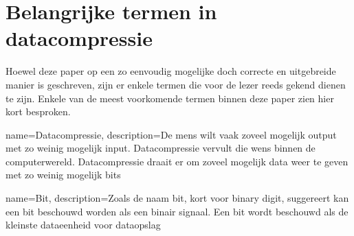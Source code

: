 \chapter{Belangrijke termen in datacompressie}
\label{ch:termen}

Hoewel deze paper op een zo eenvoudig mogelijke doch correcte en uitgebreide manier is geschreven, zijn er enkele termen die voor de lezer reeds gekend dienen te zijn. Enkele van de meest voorkomende termen binnen deze paper zien hier kort besproken.




{
	name={Datacompressie},
	description={De mens wilt vaak zoveel mogelijk output met zo weinig mogelijk input. Datacompressie vervult die wens binnen de computerwereld. Datacompressie draait er om zoveel mogelijk data weer te geven met zo weinig mogelijk bits}
}

{
	name={Bit},
	description={Zoals de naam bit, kort voor binary digit, suggereert kan een bit beschouwd worden als een binair signaal. Een bit wordt beschouwd als de kleinste dataeenheid voor dataopslag}
}



\glsaddall
\printglossary[title=Woordenlijst]
